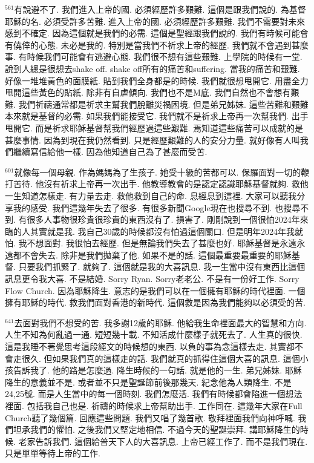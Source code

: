 \documentclass{book}
\begin{document}
$^{561}$有說避不了.
我們進入上帝的國.
必須經歷許多艱難.
這個是跟我們說的.
為基督耶穌的名.
必須受許多苦難.
進入上帝的國.
必須經歷許多艱難.
我們不需要對未來感到不確定.
因為這個就是我們的必需.
這個是聖經跟我們說的.
我們有時候可能會有僥倖的心態.
未必是我的.
特別是當我們不祈求上帝的經歷.
我們就不會遇到甚麼事.
有時候我們可能會有逃避心態.
我們很不想有這些艱難.
上學院的時候有一堂.
說到人總是很想去shake off.
shake off所有的痛苦和suffering.
當我的痛苦和艱難.
好像一堆堆黃色的面膜紙.
貼到我們全身都是的時候.
我們就很想甩開它.
用盡全力甩開這些黃色的貼紙.
除非有自虐傾向.
我們也不是M底.
我們自然也不會想有艱難.
我們祈禱通常都是祈求主幫我們脫離災禍困境.
但是弟兄姊妹.
這些苦難和艱難本來就是基督的必需.
如果我們能接受它.
我們就不是祈求上帝再一次幫我們.
出手甩開它.
而是祈求耶穌基督幫我們經歷過這些艱難.
焉知道這些痛苦可以成就的是甚麼事情.
因為到現在我仍然看到.
只是經歷艱難的人的安分力量.
就好像有人叫我們繼續寫信給他一樣.
因為他知道自己為了甚麼而受苦.

$^{601}$就像每一個母親.
作為媽媽為了生孩子.
她受十級的苦都可以.
保羅面對一切的鞭打苦待.
他沒有祈求上帝再一次出手.
他教導教會的是認定認識耶穌基督就夠.
救他一生知道怎樣走.
有力量去走.
救他救到自己的命.
息經息到這裡.
大家可以聽我分享我的感受.
我們這幾年失去了很多.
有很多新聞Google現在也搜尋不到.
也搜尋不到.
有很多人事物很珍貴很珍貴的東西沒有了.
損害了.
剛剛說到一個很怕2024年來臨的人其實就是我.
我自己30歲的時候都沒有怕過這個關口.
但是明年2024年我就怕.
我不想面對.
我很怕去經歷.
但是無論我們失去了甚麼也好.
耶穌基督是永遠永遠都不會失去.
除非是我們拋棄了他.
如果不是的話.
這個最重要最重要的耶穌基督.
只要我們抓緊了.
就夠了.
這個就是我的大喜訊息.
我一生當中沒有東西比這個訊息更令我大喜.
不是結婚.
Sorry Ryan.
Sorry老老公.
不是有一份好工作.
Sorry Flow Church.
因為耶穌降生.
意志的是我們可以在一個擁有耶穌的時代裡面.
一個擁有耶穌的時代.
救我們面對香港的新時代.
這個救是因為我們能夠以必須受的苦.

$^{641}$去面對我們不想受的苦.
我多謝12歲的耶穌.
他給我生命裡面最大的智慧和方向.
人生不知為何亂過一通.
短短幾十載.
不知活成什麼樣子就死去了.
人生真的很快.
這是我睡不著覺思考這段經文的時候想的東西.
以負的事為念這樣去走.
其實都不會走很久.
但如果我們真的這樣走的話.
我們就真的抓得住這個大喜的訊息.
這個小孩告訴我了.
他的路是怎麼過.
降生時候的一句話.
就是他的一生.
弟兄姊妹.
耶穌降生的意義並不是.
或者並不只是聖誕節前後那幾天.
紀念他為人類降生.
不是24,25號.
而是人生當中的每一個時刻.
我們怎麼活.
我們有時候都會陷進一個想法裡面.
包括我自己也是.
祈禱的時候求上帝幫助出手.
工作同在.
這幾年大家在Full Church聽了幾個篇.
回應這些問題.
我們又唱了幾首歌.
敬拜裡面我們向神呼喊.
我們坦承我們的懼怕.
之後我們又堅定地相信.
不過今天的聖誕崇拜.
講耶穌降生的時候.
老家告訴我們.
這個給普天下人的大喜訊息.
上帝已經工作了.
而不是我們現在.
只是單單等待上帝的工作.
\end{document}
